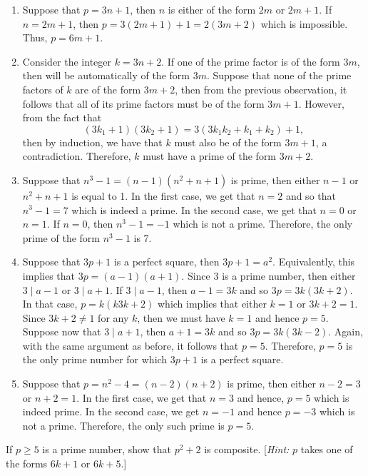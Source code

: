\begin{solution}
    \begin{enumerate}
        \item Suppose that $p = 3n+1$, then $n$ is either of the form $2m$ or $2m+1$. If $n = 2m+1$, then $p = 3(2m+1) + 1 = 2(3m+2)$ which is impossible. Thus, $p = 6m+1$.
        \item Consider the integer $k = 3n+2$. If one of the prime factor is of the form $3m$, then will be automatically of the form $3m$. Suppose that none of the prime factors of $k$ are of the form $3m+2$, then from the previous observation, it follows that all of its prime factors must be of the form $3m+1$. However, from the fact that
        $$(3k_1 + 1)(3k_2 + 1) = 3(3k_1k_2 + k_1 + k_2) + 1,$$
        then by induction, we have that $k$ must also be of the form $3m+1$, a contradiction. Therefore, $k$ must have a prime of the form $3m+2$.
        \item Suppose that $n^3 - 1 = (n-1)(n^2 + n + 1)$ is prime, then either $n - 1$ or $n^2 + n + 1$ is equal to 1. In the first case, we get that $n = 2$ and so that $n^3 - 1 = 7$ which is indeed a prime. In the second case, we get that $n = 0$ or $n = 1$. If $n = 0$, then $n^3 - 1 = -1$ which is not a prime. Therefore, the only prime of the form $n^3 - 1$ is 7.
        \item Suppose that $3p + 1$ is a perfect square, then $3p + 1 = a^2$. Equivalently, this implies that $3p = (a-1)(a+1)$. Since 3 is a prime number, then either $3 \mid a - 1$ or $3 \mid a + 1$. If $3 \mid a - 1$, then $a - 1 = 3k$ and so $3p = 3k(3k+2)$. In that case, $p = k(k3k+2)$ which implies that either $k = 1$ or $3k+2 = 1$. Since $3k+2 \neq 1$ for any $k$, then we must have $k = 1$ and hence $p = 5$. Suppose now that $3 \mid a+1$, then $a+1 = 3k$ and so $3p = 3k(3k-2)$. Again, with the same argument as before, it follows that $p = 5$. Therefore, $p = 5$ is the only prime number for which $3p + 1$ is a perfect square.
        \item Suppose that $p = n^2 - 4 = (n-2)(n+2)$ is prime, then either $n - 2 = 3$ or $n + 2 = 1$. In the first case, we get that $n = 3$ and hence, $p = 5$ which is indeed prime. In the second case, we get $n = -1$ and hence $p = -3$ which is not a prime. Therefore, the only such prime is $p = 5$.
    \end{enumerate}
\end{solution}

\begin{exercise}
    If $p \geq 5$ is a prime number, show that $p^2 + 2$ is composite. [\textit{Hint:} $p$ takes one of the forms $6k+1$ or $6k+5$.] \\
\end{exercise}

